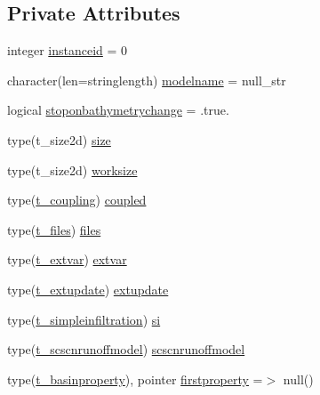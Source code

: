 \subsection*{Private Attributes}
\begin{DoxyCompactItemize}
\item 
integer \mbox{\hyperlink{structmodulebasin_1_1t__basin_ac05d7bc1a1c99ddac18d0e988b856e0b}{instanceid}} = 0
\item 
character(len=stringlength) \mbox{\hyperlink{structmodulebasin_1_1t__basin_a4c0ca0759d1dfabe6995a6e9dcf9c188}{modelname}} = null\+\_\+str
\item 
logical \mbox{\hyperlink{structmodulebasin_1_1t__basin_a2c0397ceffd6a1e5017476112d7eb4ef}{stoponbathymetrychange}} = .true.
\item 
type(t\+\_\+size2d) \mbox{\hyperlink{structmodulebasin_1_1t__basin_abfac4aafe2a35518f1e8406ff44b1cc0}{size}}
\item 
type(t\+\_\+size2d) \mbox{\hyperlink{structmodulebasin_1_1t__basin_a3d42f442922567fce0f085f375fd8bb2}{worksize}}
\item 
type(\mbox{\hyperlink{structmodulebasin_1_1t__coupling}{t\+\_\+coupling}}) \mbox{\hyperlink{structmodulebasin_1_1t__basin_ae41443d203f6055cba3083a62e8dbf27}{coupled}}
\item 
type(\mbox{\hyperlink{structmodulebasin_1_1t__files}{t\+\_\+files}}) \mbox{\hyperlink{structmodulebasin_1_1t__basin_a1efaba49725da281f86de77f48127bbe}{files}}
\item 
type(\mbox{\hyperlink{structmodulebasin_1_1t__extvar}{t\+\_\+extvar}}) \mbox{\hyperlink{structmodulebasin_1_1t__basin_a04885b93667c4494d960b3bbff634684}{extvar}}
\item 
type(\mbox{\hyperlink{structmodulebasin_1_1t__extupdate}{t\+\_\+extupdate}}) \mbox{\hyperlink{structmodulebasin_1_1t__basin_a18da76d3da119c78528ace512fc2250d}{extupdate}}
\item 
type(\mbox{\hyperlink{structmodulebasin_1_1t__simpleinfiltration}{t\+\_\+simpleinfiltration}}) \mbox{\hyperlink{structmodulebasin_1_1t__basin_a316b11c7d9c9cd693dd6db195385ae7d}{si}}
\item 
type(\mbox{\hyperlink{structmodulebasin_1_1t__scscnrunoffmodel}{t\+\_\+scscnrunoffmodel}}) \mbox{\hyperlink{structmodulebasin_1_1t__basin_acc20015ed60e3d9268973a3648db9d22}{scscnrunoffmodel}}
\item 
type(\mbox{\hyperlink{structmodulebasin_1_1t__basinproperty}{t\+\_\+basinproperty}}), pointer \mbox{\hyperlink{structmodulebasin_1_1t__basin_a404bbde5a08888ebc184c3493d621c9a}{firstproperty}} =$>$ null()

\end{DoxyCompactItemize}
